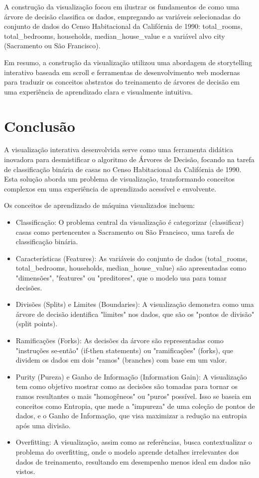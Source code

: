 \documentclass{article}
\begin{document}
A construção da visualização focou em ilustrar os fundamentos de como uma árvore de decisão classifica os 
dados, empregando as variáveis selecionadas do conjunto de dados do Censo Habitacional da Califórnia de 1990: 
total_rooms, total_bedrooms, households, median_house_value e a variável alvo city (Sacramento ou São Francisco). 
 
Em resumo, a construção da visualização utilizou uma abordagem de storytelling interativo baseada em scroll e 
ferramentas de desenvolvimento web modernas para traduzir os conceitos abstratos do treinamento de árvores de 
decisão em uma experiência de aprendizado clara e visualmente intuitiva.

\section{Conclusão}

A visualização interativa desenvolvida serve como uma ferramenta didática inovadora para desmistificar o 
algoritmo de Árvores de Decisão, focando na tarefa de classificação binária de casas no Censo Habitacional
da Califórnia de 1990. Esta solução aborda um problema de visualização, transformando conceitos complexos 
em uma experiência de aprendizado acessível e envolvente.

Os conceitos de aprendizado de máquina visualizados incluem:

\begin{itemize}
    \item Classificação: O problema central da visualização é categorizar (classificar) casas como pertencentes a 
    Sacramento ou São Francisco, uma tarefa de classificação binária.
    \item Características (Features): As variáveis do conjunto de dados (total_rooms, total_bedrooms, households, median_house_value)
    são apresentadas como "dimensões", "features" ou "preditores", que o modelo usa para tomar decisões.
    \item Divisões (Splits) e Limites (Boundaries): A visualização demonstra como uma árvore de decisão identifica "limites" 
    nos dados, que são os "pontos de divisão" (split points).
    \item Ramificações (Forks): As decisões da árvore são representadas como "instruções se-então" (if-then statements) 
    ou "ramificações" (forks), que dividem os dados em dois "ramos" (branches) com base em um valor.
    \item Purity (Pureza) e Ganho de Informação (Information Gain): A visualização tem como objetivo mostrar como as 
    decisões são tomadas para tornar os ramos resultantes o mais "homogêneos" ou "puros" possível. 
    Isso se baseia em conceitos como Entropia, que mede a "impureza" de uma coleção de pontos de dados, e o 
    Ganho de Informação, que visa maximizar a redução na entropia após uma divisão.
    \item Overfitting: A visualização, assim como as referências, busca contextualizar o problema do overfitting, 
    onde o modelo aprende detalhes irrelevantes dos dados de treinamento, resultando em desempenho menos ideal em dados não vistos.
\end{itemize}
\end{document}
